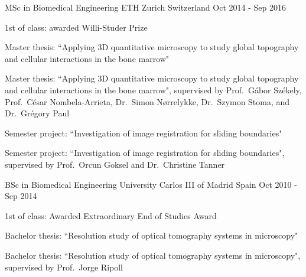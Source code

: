 \begin{cventries}
\cventryag
{MSc in Biomedical Engineering} %
{ETH Zurich}
{Switzerland}
{Oct 2014 - Sep 2016} %
{ %
\begin{cvitems}
\item {1st of class: awarded Willi-Studer Prize}
    {\item {Master thesis: ``Applying 3D quantitative microscopy to study global topography and cellular interactions in the bone marrow"}}
    {\item {Master thesis: ``Applying 3D quantitative microscopy to study global topography and cellular interactions in the bone marrow", supervised by Prof.\ Gábor Székely, Prof.\ César Nombela-Arrieta, Dr.\ Simon N{\o}rrelykke, Dr.\ Szymon Stoma, and Dr.\ Grégory Paul}}
    {\item {Semester project: ``Investigation of image registration for sliding boundaries"}}
    {\item {Semester project: ``Investigation of image registration for sliding boundaries", supervised by Prof.\ Orcun Goksel and Dr.\ Christine Tanner}}
\end{cvitems}
}

\cventryag
{BSc in Biomedical Engineering} %
{University Carlos III of Madrid}
{Spain}
{Oct 2010 - Sep 2014} %
{ %
\begin{cvitems}
\item {1st of class: Awarded Extraordinary End of Studies Award}
    {\item {Bachelor thesis: ``Resolution study of optical tomography systems in microscopy"}}
    {\item {Bachelor thesis: ``Resolution study of optical tomography systems in microscopy", supervised by Prof.\ Jorge Ripoll}}
\end{cvitems}
}

\end{cventries}